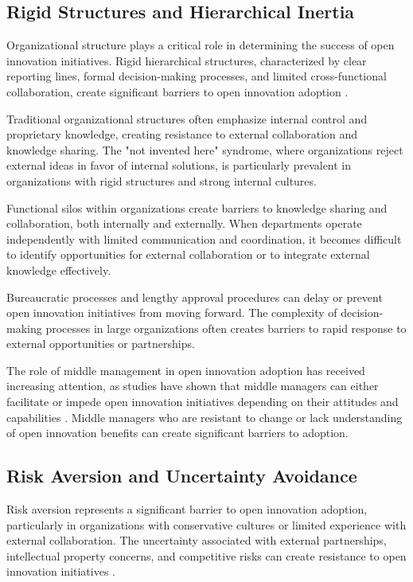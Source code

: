 \documentclass[12pt,a4paper]{article}
\begin{document}
\subsection{Rigid Structures and Hierarchical Inertia}

Organizational structure plays a critical role in determining the success of open innovation initiatives. Rigid hierarchical structures, characterized by clear reporting lines, formal decision-making processes, and limited cross-functional collaboration, create significant barriers to open innovation adoption \cite{west2014open}.

Traditional organizational structures often emphasize internal control and proprietary knowledge, creating resistance to external collaboration and knowledge sharing. The "not invented here" syndrome, where organizations reject external ideas in favor of internal solutions, is particularly prevalent in organizations with rigid structures and strong internal cultures.

Functional silos within organizations create barriers to knowledge sharing and collaboration, both internally and externally. When departments operate independently with limited communication and coordination, it becomes difficult to identify opportunities for external collaboration or to integrate external knowledge effectively.

Bureaucratic processes and lengthy approval procedures can delay or prevent open innovation initiatives from moving forward. The complexity of decision-making processes in large organizations often creates barriers to rapid response to external opportunities or partnerships.

The role of middle management in open innovation adoption has received increasing attention, as studies have shown that middle managers can either facilitate or impede open innovation initiatives depending on their attitudes and capabilities \cite{west2014open}. Middle managers who are resistant to change or lack understanding of open innovation benefits can create significant barriers to adoption.

\subsection{Risk Aversion and Uncertainty Avoidance}

Risk aversion represents a significant barrier to open innovation adoption, particularly in organizations with conservative cultures or limited experience with external collaboration. The uncertainty associated with external partnerships, intellectual property concerns, and competitive risks can create resistance to open innovation initiatives \cite{gassmann2010open}.
\end{document}
